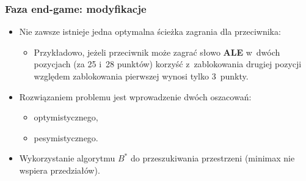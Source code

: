 \documentclass[10pt,a4paper]{beamer}
\begin{document}
\begin{frame}
	\frametitle{Faza end-game: modyfikacje}
	
	\begin{itemize}
		\item Nie zawsze istnieje jedna optymalna ścieżka zagrania dla przeciwnika:
		\begin{itemize}
			\item Przykładowo, jeżeli przeciwnik może zagrać słowo \textbf{ALE} w~dwóch pozycjach (za 25 i~28 punktów) korzyść z~zablokowania drugiej pozycji względem zablokowania pierwszej  wynosi tylko 3~punkty.
		\end{itemize}
		\item Rozwiązaniem problemu jest wprowadzenie dwóch oszacowań:
		\begin{itemize}
			\item optymistycznego,
			\item pesymistycznego.
		\end{itemize}
		\item Wykorzystanie algorytmu $B^{*}$ do przeszukiwania przestrzeni (minimax nie wspiera przedziałów).
	\end{itemize}
\end{frame}
\end{document}
